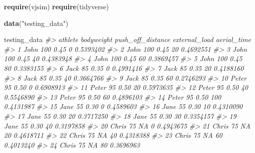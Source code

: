 \documentclass[
]{book}
\newenvironment{Shaded}{\begin{snugshade}}{\end{snugshade}}
\newcommand{\CommentTok}[1]{\textcolor[rgb]{0.56,0.35,0.01}{\textit{#1}}}
\newcommand{\KeywordTok}[1]{\textcolor[rgb]{0.13,0.29,0.53}{\textbf{#1}}}
\newcommand{\NormalTok}[1]{#1}
\newcommand{\StringTok}[1]{\textcolor[rgb]{0.31,0.60,0.02}{#1}}
\begin{document}
\begin{Shaded}
\begin{Highlighting}[]
\KeywordTok{require}\NormalTok{(vjsim)}
\KeywordTok{require}\NormalTok{(tidyverse)}

\KeywordTok{data}\NormalTok{(}\StringTok{"testing\_data"}\NormalTok{)}

\NormalTok{testing\_data}
\CommentTok{\#>    athlete bodyweight push\_off\_distance external\_load aerial\_time}
\CommentTok{\#> 1     John        100              0.45             0   0.5393402}
\CommentTok{\#> 2     John        100              0.45            20   0.4692551}
\CommentTok{\#> 3     John        100              0.45            40   0.4383948}
\CommentTok{\#> 4     John        100              0.45            60   0.3869457}
\CommentTok{\#> 5     John        100              0.45            80   0.3383155}
\CommentTok{\#> 6     Jack         85              0.35             0   0.4991416}
\CommentTok{\#> 7     Jack         85              0.35            20   0.4188160}
\CommentTok{\#> 8     Jack         85              0.35            40   0.3664766}
\CommentTok{\#> 9     Jack         85              0.35            60   0.2746293}
\CommentTok{\#> 10   Peter         95              0.50             0   0.6908913}
\CommentTok{\#> 11   Peter         95              0.50            20   0.5973635}
\CommentTok{\#> 12   Peter         95              0.50            40   0.5546890}
\CommentTok{\#> 13   Peter         95              0.50            60   0.4896103}
\CommentTok{\#> 14   Peter         95              0.50           100   0.4131987}
\CommentTok{\#> 15    Jane         55              0.30             0   0.4589603}
\CommentTok{\#> 16    Jane         55              0.30            10   0.4310090}
\CommentTok{\#> 17    Jane         55              0.30            20   0.3717250}
\CommentTok{\#> 18    Jane         55              0.30            30   0.3354157}
\CommentTok{\#> 19    Jane         55              0.30            40   0.3197858}
\CommentTok{\#> 20   Chris         75                NA             0   0.4943675}
\CommentTok{\#> 21   Chris         75                NA            20   0.4618711}
\CommentTok{\#> 22   Chris         75                NA            40   0.4318388}
\CommentTok{\#> 23   Chris         75                NA            60   0.4013240}
\CommentTok{\#> 24   Chris         75                NA            80   0.3696963}
\end{Highlighting}
\end{Shaded}
\end{document}
